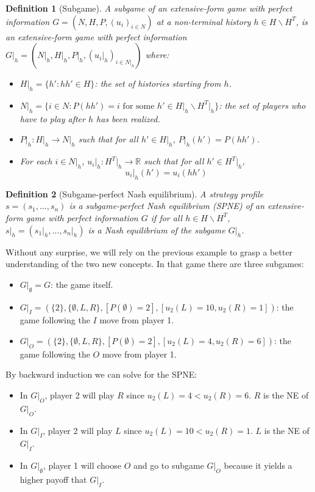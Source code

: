 \documentclass[12pt]{report}
\newtheorem{definition}{Definition}[chapter]
\begin{document}
\begin{definition}[Subgame]
A subgame of an extensive-form game with perfect information $G = (N, H, P, (u_i)_{i\in N})$ at a non-terminal history $h\in H\backslash H^T$, is an extensive-form game with perfect information $G\vert_h = (N\vert_h, H\vert_h, P\vert_h, (u_i\vert_h)_{i\in N\vert_h})$ where:\begin{itemize}
\item $H\vert_h = \{h' : hh'\in H\}$: the set of histories starting from $h$.
\item $N\vert_h = \{i\in N : P(hh') = i\text{ for some } h'\in H\vert_h\backslash H^T\vert_h\}$: the set of players who have to play after $h$ has been realized.
\item $P\vert_h: H\vert_h\to N\vert_h$ such that for all $h'\in H\vert_h$, $P\vert_h(h') = P(hh')$.
\item For each $i\in N\vert_h$, $u_i\vert_h : H^T\vert_h\to\mathbb{R}$ such that for all $h'\in H^T\vert_h$, $$u_i\vert_h(h') = u_i(hh')$$
\end{itemize}
\end{definition}

\begin{definition}[Subgame-perfect Nash equilibrium]
A strategy profile $s = (s_1, ..., s_n)$ is a subgame-perfect Nash equilibrium (SPNE) of an extensive-form game with perfect information $G$ if for all $h\in H\backslash H^T$, $s\vert_h = (s_1\vert_h, ..., s_n\vert_h)$ is a Nash equilibrium of the subgame $G\vert_h$.
\end{definition}

Without any surprise, we will rely on the previous example to grasp a better understanding of the two new concepts. In that game there are three subgames:\begin{itemize}
\item $G\vert_\emptyset = G$: the game itself.
\item $G\vert_I = \left(\{2\}, \{\emptyset, L, R\}, [P(\emptyset) = 2], [u_2(L) = 10, u_2(R) = 1]\right)$: the game following the $I$ move from player 1.
\item $G\vert_O = \left(\{2\}, \{\emptyset, L, R\}, [P(\emptyset) = 2], [u_2(L) = 4, u_2(R) = 6]\right)$: the game following the $O$ move from player 1.
\end{itemize}

By backward induction we can solve for the SPNE:\begin{itemize}
\item In $G\vert_O$, player 2 will play $R$ since $u_2(L) = 4 < u_2(R) = 6$. $R$ is the NE of $G\vert_O$.
\item In $G\vert_I$, player 2 will play $L$ since $u_2(L) = 10 < u_2(R) = 1$. $L$ is the NE of $G\vert_I$.
\item In $G\vert_\emptyset$, player 1 will choose $O$ and go to subgame $G\vert_O$ because it yields a higher payoff that $G\vert_I$.
\end{itemize}
\end{document}
